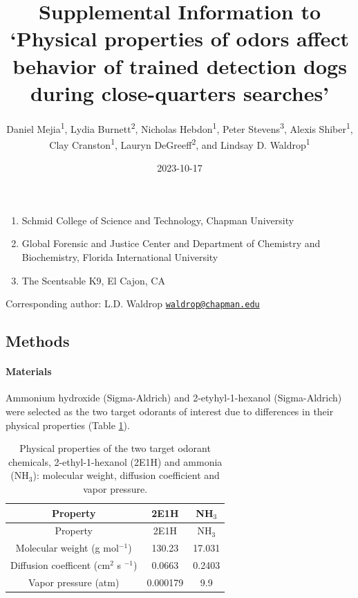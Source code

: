 \documentclass[
]{article}
\title{Supplemental Information to `Physical properties of odors affect behavior of trained detection dogs during close-quarters searches'}
\author{Daniel Mejia\textsuperscript{1}, Lydia Burnett\textsuperscript{2}, Nicholas Hebdon\textsuperscript{1}, Peter Stevens\textsuperscript{3}, Alexis Shiber\textsuperscript{1}, Clay Cranston\textsuperscript{1}, Lauryn DeGreeff\textsuperscript{2}, and Lindsay D. Waldrop\textsuperscript{1}}
\date{2023-10-17}
\providecommand{\tightlist}{%
  \setlength{\itemsep}{0pt}\setlength{\parskip}{0pt}}
\begin{document}
\maketitle

\begin{enumerate}
\def\labelenumi{\arabic{enumi}.}
\tightlist
\item
  Schmid College of Science and Technology, Chapman University
\item
  Global Forensic and Justice Center and Department of Chemistry and Biochemistry, Florida International University
\item
  The Scentsable K9, El Cajon, CA
\end{enumerate}

Corresponding author: L.D. Waldrop \href{mailto:waldrop@chapman.edu}{\nolinkurl{waldrop@chapman.edu}}

\hypertarget{methods}{%
\subsection{Methods}\label{methods}}

\hypertarget{materials}{%
\paragraph{Materials}\label{materials}}

Ammonium hydroxide (Sigma-Aldrich) and 2-etyhyl-1-hexanol (Sigma-Aldrich) were selected as the two target odorants of interest due to differences in their physical properties (Table \ref{tab:chem-table}).

\begin{longtable}[]{@{}ccc@{}}
\caption{\label{tab:chem-table}Physical properties of the two target odorant chemicals, 2-ethyl-1-hexanol (2E1H) and ammonia (NH\(_3\)): molecular weight, diffusion coefficient and vapor pressure.}\tabularnewline
\toprule\noalign{}
Property & 2E1H & NH\(_3\) \\
\midrule\noalign{}
\endfirsthead
\toprule\noalign{}
Property & 2E1H & NH\(_3\) \\
\midrule\noalign{}
\endhead
\bottomrule\noalign{}
\endlastfoot
Molecular weight (g mol\(^{-1}\)) & 130.23 & 17.031 \\
Diffusion coefficent (cm\(^2\) s \(^{-1}\)) & 0.0663 & 0.2403 \\
Vapor pressure (atm) & 0.000179 & 9.9 \\
\end{longtable}
\end{document}
